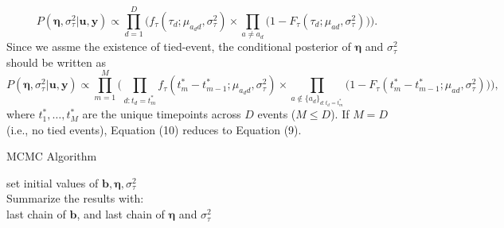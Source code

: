 \documentclass[12pt]{article}
\begin{document}
\begin{equation}
P(\boldsymbol{\eta}, \sigma_\tau^2| \boldsymbol{u}, \boldsymbol{y})\propto \prod_{d=1}^D\Big(f_{\tau}(\tau_{d}; \mu_{a_d d}, \sigma_\tau^2)\times \prod_{a\neq a_d}\big(1-F_{\tau}(\tau_{d}; \mu_{a d}, \sigma_\tau^2) \big)\Big).
\end{equation}
Since we assme the existence of tied-event, the conditional posterior of $\boldsymbol{\eta}$ and $\sigma_{\tau}^2$ should be written as
\begin{equation}
P(\boldsymbol{\eta}, \sigma_\tau^2| \boldsymbol{u}, \boldsymbol{y})\propto \prod_{m=1}^M\Big(\prod_{d:t_d=t_m^*}f_{\tau}(t_m^*-t_{m-1}^*; \mu_{a_d d}, \sigma_\tau^2)\times \prod_{a \notin \{a_d\}_{d:t_d=t_m^*}}\big(1-F_{\tau}(t_m^*-t_{m-1}^*; \mu_{a d}, \sigma_\tau^2) \big)\Big),
\end{equation}
where $t_1^*,\ldots,t_M^*$ are the unique timepoints across $D$ events ($M \leq D$). If $M=D$ (i.e., no tied events), Equation (10) reduces to Equation (9).

 \begin{algorithm}[H]
 	\SetAlgoLined
 	\caption{MCMC Algorithm}
 	set initial values of $\boldsymbol{b}, \boldsymbol{\eta}, \sigma_\tau^2$\\
 	Summarize the results with: \\last chain of $\boldsymbol{b}$, and last chain of $\boldsymbol{\eta}$ and $\sigma_\tau^2$ 
 \end{algorithm}
 
\end{document}
